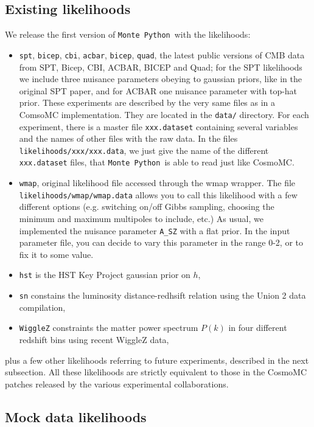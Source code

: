 \documentclass[10pt]{article}
\newcommand{\MP}{\texttt{Monte Python}}
\begin{document}
\subsection{Existing likelihoods}

We release the first version of \MP~with the likelihoods:
\begin{itemize}
\item \verb?spt?, \verb?bicep?, \verb?cbi?, \verb?acbar?, \verb?bicep?, \verb?quad?, the latest public versions of CMB data from SPT, Bicep, CBI, ACBAR, BICEP and Quad; for the SPT likelihoods we include three nuisance parameters obeying to gaussian priors, like in the original SPT paper, and for ACBAR one nuisance parameter with top-hat prior. These experiments are described by the very same files as in a ComsoMC implementation. They are located in the \verb?data/? directory. For each experiment, there is a master file \verb?xxx.dataset? containing several variables and the names of other files with the raw data. In the files \verb?likelihoods/xxx/xxx.data?, we just give the name of the different \verb?xxx.dataset? files, that \MP~is able to read just like CosmoMC.
\item \verb?wmap?, original likelihood file accessed through the wmap wrapper. The file \verb?likelihoods/wmap/wmap.data? allows you to call this likelihood with a few different options (e.g. switching on/off Gibbs sampling, choosing the minimum and maximum multipoles to include, etc.) As usual, we implemented the nuisance parameter \verb?A_SZ? with a flat prior. In the input parameter file, you can decide to vary this parameter in the range 0-2, or to fix it to some value.
\item \verb?hst? is the HST Key Project gaussian prior on $h$,
\item \verb?sn? constains the luminosity distance-redhsift relation using the Union 2 data compilation,
\item \verb?WiggleZ? constraints the matter power spectrum $P(k)$ in four different redshift bins using recent WiggleZ data,
\end{itemize}
plus a few other likelihoods referring to future experiments, described in the next subsection. All these likelihoods are strictly equivalent to those in the CosmoMC patches released by the various experimental collaborations.

\subsection{Mock data likelihoods}
\end{document}
